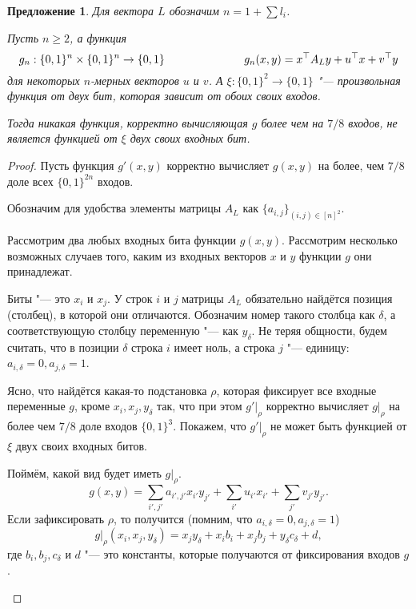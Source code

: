 \documentclass[oneside, a4paper]{article}
\newtheorem{proposition}{Предложение}
\theoremstyle{definition}
\theoremstyle{remark}
\begin{document}
\begin{proposition} \label{tough}
Для вектора $L$ обозначим $n = 1 + \sum l_i$.

Пусть $n \geq 2$, а функция
\[
g_n : \{0, 1\}^n \times \{0, 1\}^n \to \{0, 1\} \hspace{2.5cm}
g_n(x, y) = x^\top A_L y + u^\top x + v^\top y
\]
для некоторых $n$-мерных векторов $u$ и $v$. А $\xi : \{0, 1\}^2 \to \{0, 1\}$
"--- произвольная функция от двух бит, которая зависит от обоих своих входов.

Тогда никакая функция, корректно вычисляющая $g$ более чем на $7/8$ входов, не
является функцией от $\xi$ двух своих входных бит.
\end{proposition}

\begin{proof}
Пусть функция $g'(x, y)$ корректно вычисляет $g(x, y)$ на более, чем $7/8$ доле
всех $\{0, 1\}^{2n}$ входов.

Обозначим для удобства элементы матрицы $A_L$ как $\{a_{i, j}\}_{(i, j) \in {[n]^2}}$.

Рассмотрим два любых входных бита функции $g(x, y)$. Рассмотрим несколько
возможных случаев того, каким из входных векторов $x$ и $y$ функции $g$ они
принадлежат.
\begin{description}
\item{Биты "--- это $x_i$ и $x_j$.} У строк $i$ и $j$ матрицы $A_L$ обязательно
найдётся позиция (столбец), в которой они отличаются. Обозначим номер такого
столбца как $\delta$, а соответствующую столбцу переменную "--- как $y_\delta$.
Не теряя общности, будем считать, что в позиции $\delta$ строка $i$ имеет ноль,
а строка $j$ "--- единицу: $a_{i, \delta} = 0, a_{j, \delta} = 1$.

Ясно, что найдётся какая-то подстановка $\rho$, которая фиксирует все входные
переменные $g$, кроме $x_i, x_j, y_\delta$ так, что при этом $g' \rvert _ \rho$
корректно вычисляет $g \rvert _ \rho$ на более чем $7/8$ доле входов $\{0,
1\}^3$. Покажем, что $g' \rvert _ \rho$ не может быть функцией от $\xi$ двух своих
входных битов.

Поймём, какой вид будет иметь $g \rvert _ \rho$. 
\[
g(x, y) = \sum_{i', j'} a_{i', j'} x_{i'} y_{j'} + \sum_{i'} u_{i'} x_{i'} + \sum_{j'} v_{j'} y_{j'}.
\]
Если зафиксировать $\rho$, то получится (помним, что $a_{i, \delta} = 0, a_{j, \delta} = 1$)
\[
g \rvert _ \rho (x_i, x_j, y_\delta) = x_j y_\delta + x_i b_i + x_j b_j + y_\delta c_\delta + d,
\]
где $b_i, b_j, c_\delta$ и $d$ "--- это константы, которые получаются от
фиксирования входов $g$.


\end{description}
\end{proof}
\end{document}
